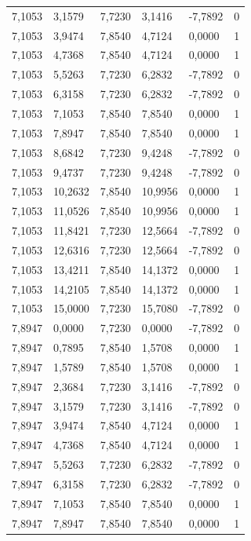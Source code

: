 \documentclass[12pt]{article}
\begin{document}
\begin{longtable}{@{}llllll@{}}
		7,1053  & 3,1579  & 7,7230  & 3,1416  & -7,7892  & 0  \\
		7,1053  & 3,9474  & 7,8540  & 4,7124  & 0,0000   & 1  \\
		7,1053  & 4,7368  & 7,8540  & 4,7124  & 0,0000   & 1  \\
		7,1053  & 5,5263  & 7,7230  & 6,2832  & -7,7892  & 0  \\
		7,1053  & 6,3158  & 7,7230  & 6,2832  & -7,7892  & 0  \\
		7,1053  & 7,1053  & 7,8540  & 7,8540  & 0,0000   & 1  \\
		7,1053  & 7,8947  & 7,8540  & 7,8540  & 0,0000   & 1  \\
		7,1053  & 8,6842  & 7,7230  & 9,4248  & -7,7892  & 0  \\
		7,1053  & 9,4737  & 7,7230  & 9,4248  & -7,7892  & 0  \\
		7,1053  & 10,2632 & 7,8540  & 10,9956 & 0,0000   & 1  \\
		7,1053  & 11,0526 & 7,8540  & 10,9956 & 0,0000   & 1  \\
		7,1053  & 11,8421 & 7,7230  & 12,5664 & -7,7892  & 0  \\
		7,1053  & 12,6316 & 7,7230  & 12,5664 & -7,7892  & 0  \\
		7,1053  & 13,4211 & 7,8540  & 14,1372 & 0,0000   & 1  \\
		7,1053  & 14,2105 & 7,8540  & 14,1372 & 0,0000   & 1  \\
		7,1053  & 15,0000 & 7,7230  & 15,7080 & -7,7892  & 0  \\
		7,8947  & 0,0000  & 7,7230  & 0,0000  & -7,7892  & 0  \\
		7,8947  & 0,7895  & 7,8540  & 1,5708  & 0,0000   & 1  \\
		7,8947  & 1,5789  & 7,8540  & 1,5708  & 0,0000   & 1  \\
		7,8947  & 2,3684  & 7,7230  & 3,1416  & -7,7892  & 0  \\
		7,8947  & 3,1579  & 7,7230  & 3,1416  & -7,7892  & 0  \\
		7,8947  & 3,9474  & 7,8540  & 4,7124  & 0,0000   & 1  \\
		7,8947  & 4,7368  & 7,8540  & 4,7124  & 0,0000   & 1  \\
		7,8947  & 5,5263  & 7,7230  & 6,2832  & -7,7892  & 0  \\
		7,8947  & 6,3158  & 7,7230  & 6,2832  & -7,7892  & 0  \\
		7,8947  & 7,1053  & 7,8540  & 7,8540  & 0,0000   & 1  \\
		7,8947  & 7,8947  & 7,8540  & 7,8540  & 0,0000   & 1  \\

\end{longtable}
\end{document}
